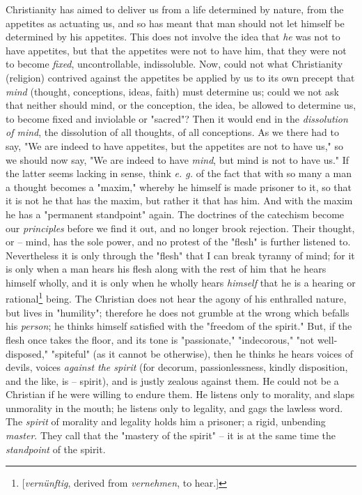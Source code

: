 \documentclass[a4paper]{book}
\begin{document}
Christianity has aimed to deliver us from a life determined by nature, from 
the appetites as actuating us, and so has meant that man should not let 
himself be determined by his appetites. This does not involve the idea that 
\textit{he} was not to have appetites, but that the appetites were not to have 
him, that they were not to become \textit{fixed}, uncontrollable, 
indissoluble. Now, could not what Christianity (religion) contrived against 
the appetites be applied by us to its own precept that \textit{mind} (thought, 
conceptions, ideas, faith) must determine us; could we not ask that neither 
should mind, or the conception, the idea, be allowed to determine us, to 
become fixed and inviolable or "{}sacred"{}? Then it would end in the 
\textit{dissolution of mind}, the dissolution of all thoughts, of all 
conceptions. As we there had to say, "{}We are indeed to have appetites, but 
the appetites are not to have us,"{} so we should now say, "{}We are indeed to 
have \textit{mind}, but mind is not to have us."{} If the latter seems lacking 
in sense, think \textit{e. g.} of the fact that with so many a man a thought 
becomes a "{}maxim,"{} whereby he himself is made prisoner to it, so that it 
is not he that has the maxim, but rather it that has him. And with the maxim 
he has a "{}permanent standpoint"{} again. The doctrines of the catechism 
become our \textit{principles} before we find it out, and no longer brook 
rejection. Their thought, or -- mind, has the sole power, and no protest of 
the "{}flesh"{} is further listened to. Nevertheless it is only through the 
"{}flesh"{} that I can break tyranny of mind; for it is only when a man hears 
his flesh along with the rest of him that he hears himself wholly, and it is 
only when he wholly hears \textit{himself} that he is a hearing or 
rational\footnote{[\textit{vern\"unftig}, derived from \textit{vernehmen}, to 
hear.]} being. The Christian does not hear the agony of his enthralled nature, 
but lives in "{}humility"{}; therefore he does not grumble at the wrong which 
befalls his \textit{person}; he thinks himself satisfied with the "{}freedom 
of the spirit."{} But, if the flesh once takes the floor, and its tone is 
"{}passionate,"{} "{}indecorous,"{} "{}not well-disposed,"{} "{}spiteful"{} 
(as it cannot be otherwise), then he thinks he hears voices of devils, voices 
\textit{against the spirit} (for decorum, passionlessness, kindly disposition, 
and the like, is -- spirit), and is justly zealous against them. He could not 
be a Christian if he were willing to endure them. He listens only to morality, 
and slaps unmorality in the mouth; he listens only to legality, and gags the 
lawless word. The \textit{spirit} of morality and legality holds him a 
prisoner; a rigid, unbending \textit{master}. They call that the "{}mastery of 
the spirit"{} -- it is at the same time the \textit{standpoint} of the spirit.
\end{document}

